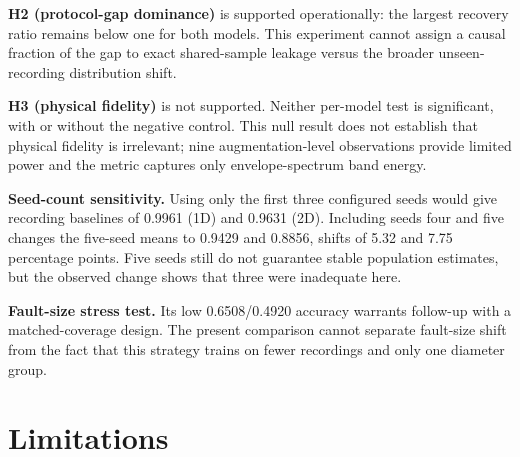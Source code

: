 ﻿\documentclass[11pt,a4paper]{article}
\begin{document}
\textbf{H2 (protocol-gap dominance)} is supported operationally: the largest recovery ratio remains below one for both models. This experiment cannot assign a causal fraction of the gap to exact shared-sample leakage versus the broader unseen-recording distribution shift.

\textbf{H3 (physical fidelity)} is not supported. Neither per-model test is significant, with or without the negative control. This null result does not establish that physical fidelity is irrelevant; nine augmentation-level observations provide limited power and the metric captures only envelope-spectrum band energy.

\textbf{Seed-count sensitivity.} Using only the first three configured seeds would give recording baselines of 0.9961 (1D) and 0.9631 (2D). Including seeds four and five changes the five-seed means to 0.9429 and 0.8856, shifts of 5.32 and 7.75 percentage points. Five seeds still do not guarantee stable population estimates, but the observed change shows that three were inadequate here.

\textbf{Fault-size stress test.} Its low 0.6508/0.4920 accuracy warrants follow-up with a matched-coverage design. The present comparison cannot separate fault-size shift from the fact that this strategy trains on fewer recordings and only one diameter group.

\section{Limitations}
\end{document}
